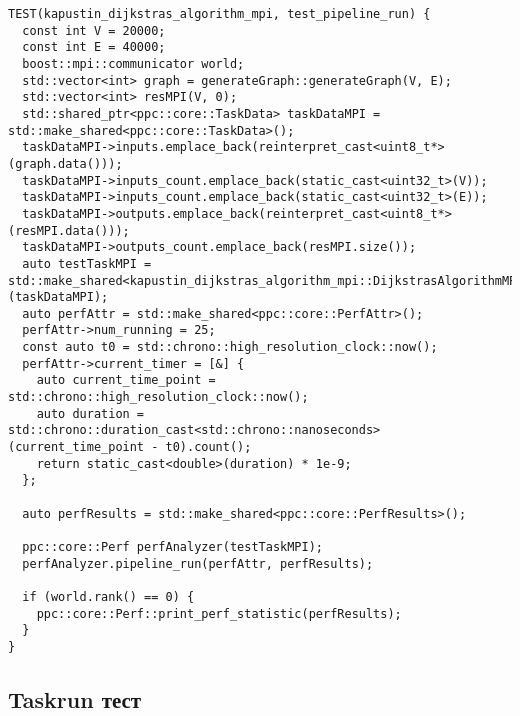 \documentclass[a4paper,14pt]{extarticle}
\begin{document}
\begin{lstlisting}[caption={Пример теста для pipeline}]
TEST(kapustin_dijkstras_algorithm_mpi, test_pipeline_run) {
  const int V = 20000;
  const int E = 40000;
  boost::mpi::communicator world;
  std::vector<int> graph = generateGraph::generateGraph(V, E);
  std::vector<int> resMPI(V, 0);
  std::shared_ptr<ppc::core::TaskData> taskDataMPI = std::make_shared<ppc::core::TaskData>();
  taskDataMPI->inputs.emplace_back(reinterpret_cast<uint8_t*>(graph.data()));
  taskDataMPI->inputs_count.emplace_back(static_cast<uint32_t>(V));
  taskDataMPI->inputs_count.emplace_back(static_cast<uint32_t>(E));
  taskDataMPI->outputs.emplace_back(reinterpret_cast<uint8_t*>(resMPI.data()));
  taskDataMPI->outputs_count.emplace_back(resMPI.size());
  auto testTaskMPI = std::make_shared<kapustin_dijkstras_algorithm_mpi::DijkstrasAlgorithmMPI>(taskDataMPI);
  auto perfAttr = std::make_shared<ppc::core::PerfAttr>();
  perfAttr->num_running = 25;
  const auto t0 = std::chrono::high_resolution_clock::now();
  perfAttr->current_timer = [&] {
    auto current_time_point = std::chrono::high_resolution_clock::now();
    auto duration = std::chrono::duration_cast<std::chrono::nanoseconds>(current_time_point - t0).count();
    return static_cast<double>(duration) * 1e-9;
  };

  auto perfResults = std::make_shared<ppc::core::PerfResults>();

  ppc::core::Perf perfAnalyzer(testTaskMPI);
  perfAnalyzer.pipeline_run(perfAttr, perfResults);

  if (world.rank() == 0) {
    ppc::core::Perf::print_perf_statistic(perfResults);
  }
}
\end{lstlisting}
\clearpage
\subsection{Taskrun тест}

\end{document}
